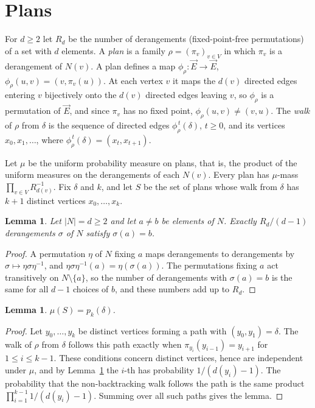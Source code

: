 \documentclass[11pt]{amsart}
\newtheorem{lemma}[theorem]{Lemma}
\theoremstyle{remark}
\newcommand{\vE}{\vec{E}}
\begin{document}
\section{Plans}\label{sec:plans}

For $d\ge2$ let $R_d$ be the number of derangements (fixed-point-free permutations) of a set with $d$ elements. A
\emph{plan} is a family $\rho=(\pi_v)_{v\in V}$ in which $\pi_v$ is a derangement of $N(v)$. A plan defines a map
$\phi_\rho:\vE\to\vE$, $\phi_\rho(u,v)=(v,\pi_v(u))$. At each vertex $v$ it maps the $d(v)$ directed edges entering $v$
bijectively onto the $d(v)$ directed edges leaving $v$, so $\phi_\rho$ is a permutation of $\vE$, and since $\pi_v$ has
no fixed point, $\phi_\rho(u,v)\ne(v,u)$. The \emph{walk} of $\rho$ from $\delta$ is the sequence of directed edges
$\phi_\rho^{\,t}(\delta)$, $t\ge0$, and its vertices $x_0,x_1,\dots$, where $\phi_\rho^{\,t}(\delta)=(x_t,x_{t+1})$.

Let $\mu$ be the uniform probability measure on plans, that is, the product of the uniform measures on the derangements
of each $N(v)$. Every plan has $\mu$-mass $\prod_{v\in V}R_{d(v)}^{-1}$. Fix $\delta$ and $k$, and let $S$ be the set of
plans whose walk from $\delta$ has $k+1$ distinct vertices $x_0,\dots,x_k$.

\begin{lemma}\label{lem:derangement}
Let $|N|=d\ge2$ and let $a\ne b$ be elements of $N$. Exactly $R_d/(d-1)$ derangements $\sigma$ of $N$ satisfy
$\sigma(a)=b$.
\end{lemma}

\begin{proof}
A permutation $\eta$ of $N$ fixing $a$ maps derangements to derangements by $\sigma\mapsto\eta\sigma\eta^{-1}$, and
$\eta\sigma\eta^{-1}(a)=\eta(\sigma(a))$. The permutations fixing $a$ act transitively on $N\setminus\{a\}$, so the
number of derangements with $\sigma(a)=b$ is the same for all $d-1$ choices of $b$, and these numbers add up to $R_d$.
\end{proof}

\begin{lemma}\label{lem:simple}
$\mu(S)=p_k(\delta)$.
\end{lemma}

\begin{proof}
Let $y_0,\dots,y_k$ be distinct vertices forming a path with $(y_0,y_1)=\delta$. The walk of $\rho$ from $\delta$
follows this path exactly when $\pi_{y_i}(y_{i-1})=y_{i+1}$ for $1\le i\le k-1$. These conditions concern distinct
vertices, hence are independent under $\mu$, and by Lemma~\ref{lem:derangement} the $i$-th has probability
$1/(d(y_i)-1)$. The probability that the non-backtracking walk follows the path is the same product
$\prod_{i=1}^{k-1}1/(d(y_i)-1)$. Summing over all such paths gives the lemma.
\end{proof}
\end{document}

